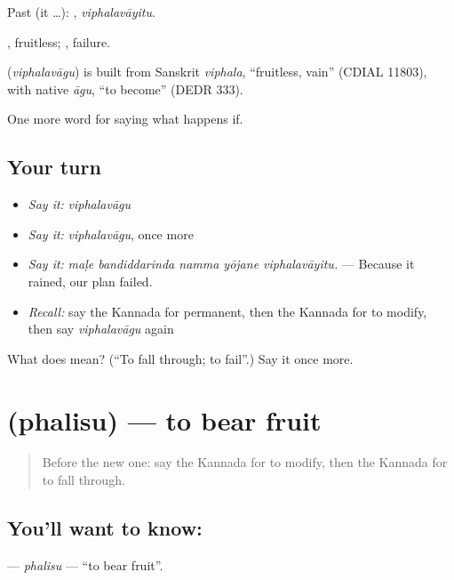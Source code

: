 Past (it …): , \emph{viphalavāyitu}.

, fruitless; , failure.

\begin{cousinweb}
\textbf{} (\emph{viphalavāgu}) is built from Sanskrit \emph{viphala}, \textquotedblleft{}fruitless, vain\textquotedblright{} (CDIAL 11803), with native \emph{āgu}, \textquotedblleft{}to become\textquotedblright{} (DEDR 333).
\end{cousinweb}

\begin{grammarlens}[title={What you've built}]
One more word for saying what happens if.
\end{grammarlens}

\subsection*{Your turn}
\begin{itemize}
\raggedright
  \item \emph{Say it:} \emph{viphalavāgu}
  \item \emph{Say it:} \emph{viphalavāgu}, once more
  \item \emph{Say it:} \emph{maḷe bandiddarinda namma yōjane viphalavāyitu.} — Because it rained, our plan failed.
  \item \emph{Recall:} say the Kannada for permanent, then the Kannada for to modify, then say \emph{viphalavāgu} again
\end{itemize}

\begin{tcolorbox}[breakable,colback=teal!4,colframe=teal!35!black,title={Before you move on}]
What does  mean? (\textquotedblleft{}To fall through; to fail\textquotedblright{}.) Say it once more.
\end{tcolorbox}
\section[\texorpdfstring{\kn{ಫಲಿಸು} (phalisu)}{ಫಲಿಸು (phalisu)}]{ (phalisu) — to bear fruit}

\label{lesson:KA-C419-phalisu}



\begin{quote}
Before the new one: say the Kannada for to modify, then the Kannada for to fall through.
\end{quote}

\subsection*{You'll want to know: }
\textbf{} — \emph{phalisu} — \textquotedblleft{}to bear fruit\textquotedblright{}.


